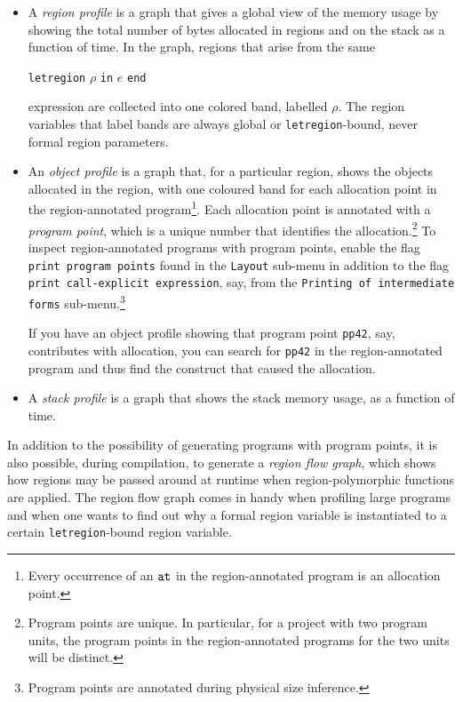 \documentclass[12pt]{book}
\begin{document}
\begin{itemize}
\item A 
  {\em region profile\/} is a graph that gives a global view of the
  memory usage by showing the total number of bytes allocated in
  regions and on the stack as a function of time. In the graph,
  regions that arise from the same
  \begin{center}
    \texttt{letregion} $\rho$ \texttt{in} $e$ \texttt{end}
  \end{center}
  expression are collected into one colored band, labelled $\rho$. The
  region variables that label bands are always global or {\tt letregion}-bound,
  never formal region parameters.
\item An 
  {\em object profile\/} is a graph that, for a particular region,
  shows the objects allocated in the region, with one coloured band
  for each allocation point in the region-annotated
  program\footnote{Every occurrence of an $\mathbin{\hbox{\tt at}}$ in the
    region-annotated program is an allocation point.}. Each allocation
  point is annotated with a
  {\em program point}, which is a unique number that identifies the
  allocation.\footnote{Program points are unique. In particular, for a
    project with two program units, the program points in the
    region-annotated programs for the two units will be distinct.}  To
  inspect region-annotated programs with program points, enable the
  flag {\tt print program points} found in the {\tt Layout} sub-menu
  in addition to the flag {\tt print call-explicit expression}, say,
  from the {\tt Printing of intermediate forms}
  sub-menu.\footnote{Program points are annotated during physical size
    inference.}
  
  If you have an object profile showing that program point
  \texttt{pp42}, say, contributes with allocation, you can search for
  \texttt{pp42} in the region-annotated program and thus find the
  construct that caused the allocation.
\item A 
  {\em stack profile\/} is a graph that shows the stack memory usage,
  as a function of time.
\end{itemize}
  
In addition to the possibility of generating programs with program
points, it is also possible, during compilation, to generate a
%
{\em region flow graph}, which shows how regions may be passed around
at runtime when region-polymorphic functions are applied. The region
flow graph comes in handy when profiling large programs and when one wants
to find out why a formal region variable is instantiated to a
certain {\tt letregion}-bound region variable.
\end{document}
